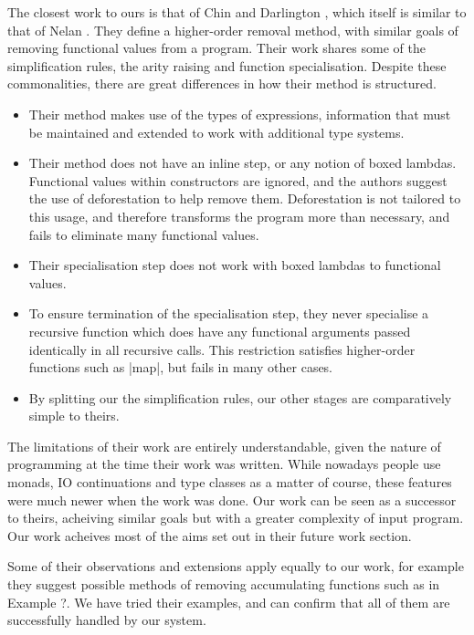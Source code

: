 \documentclass[preprint]{sigplanconf}
\begin{document}
The closest work to ours is that of Chin and Darlington \cite{chin:higher_order_removal}, which itself is similar to that of Nelan \cite{nelan:firstification}. They define a higher-order removal method, with similar goals of removing functional values from a program. Their work shares some of the simplification rules, the arity raising and function specialisation. Despite these commonalities, there are great differences in how their method is structured.

\begin{itemize}
\item Their method makes use of the types of expressions, information that must be maintained and extended to work with additional type systems.
\item Their method does not have an inline step, or any notion of boxed lambdas. Functional values within constructors are ignored, and the authors suggest the use of deforestation \cite{wadler:deforestation} to help remove them. Deforestation is not tailored to this usage, and therefore transforms the program more than necessary, and fails to eliminate many functional values.
\item Their specialisation step does not work with boxed lambdas to functional values.
\item To ensure termination of the specialisation step, they never specialise a recursive function which does have any functional arguments passed identically in all recursive calls. This restriction satisfies higher-order functions such as |map|, but fails in many other cases.
\item By splitting our the simplification rules, our other stages are comparatively simple to theirs.
\end{itemize}

The limitations of their work are entirely understandable, given the nature of programming at the time their work was written. While nowadays people use monads, IO continuations and type classes as a matter of course, these features were much newer when the work was done. Our work can be seen as a successor to theirs, acheiving similar goals but with a greater complexity of input program. Our work acheives most of the aims set out in their future work section.

Some of their observations and extensions apply equally to our work, for example they suggest possible methods of removing accumulating functions such as in Example ?. We have tried their examples, and can confirm that all of them are successfully handled by our system.
\end{document}
